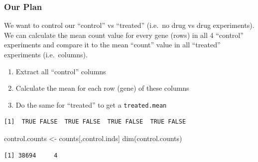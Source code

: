 \documentclass[
  letterpaper,
  DIV=11,
  numbers=noendperiod]{scrartcl}
\newenvironment{Shaded}{\begin{snugshade}}{\end{snugshade}}
\newcommand{\FunctionTok}[1]{\textcolor[rgb]{0.28,0.35,0.67}{#1}}
\newcommand{\NormalTok}[1]{\textcolor[rgb]{0.00,0.23,0.31}{#1}}
\newcommand{\OtherTok}[1]{\textcolor[rgb]{0.00,0.23,0.31}{#1}}
\newcommand{\SpecialCharTok}[1]{\textcolor[rgb]{0.37,0.37,0.37}{#1}}
\newcommand{\StringTok}[1]{\textcolor[rgb]{0.13,0.47,0.30}{#1}}
\providecommand{\tightlist}{%
  \setlength{\itemsep}{0pt}\setlength{\parskip}{0pt}}
\begin{document}
\subsubsection{Our Plan}\label{our-plan}

We want to control our ``control'' vs ``treated'' (i.e.~no drug vs drug
experiments). We can calculate the mean count value for every gene
(rows) in all 4 ``control'' experiments and compare it to the mean
``count'' value in all ``treated'' experiments (i.e.~columns).

\begin{enumerate}
\def\labelenumi{\arabic{enumi}.}
\tightlist
\item
  Extract all ``control'' columns
\item
  Calculate the mean for each row (gene) of these columns
\item
  Do the same for ``treated'' to get a \texttt{treated.mean}
\end{enumerate}

\begin{Shaded}
\end{Shaded}

\begin{verbatim}
[1]  TRUE FALSE  TRUE FALSE  TRUE FALSE  TRUE FALSE
\end{verbatim}

\begin{Shaded}
\end{Shaded}

\begin{Shaded}
\begin{Highlighting}[]
\NormalTok{control.counts }\OtherTok{\textless{}{-}}\NormalTok{ counts[,control.inds]}
\FunctionTok{dim}\NormalTok{(control.counts)}
\end{Highlighting}
\end{Shaded}

\begin{verbatim}
[1] 38694     4
\end{verbatim}
\end{document}
